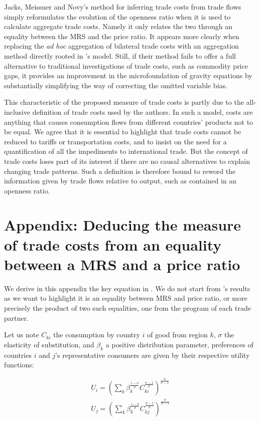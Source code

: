 \documentclass{article}
\begin{document}
Jacks, Meissner and Novy's method for inferring trade costs
from trade flows simply reformulates the evolution of the
openness ratio when it is used to calculate aggregate trade
costs. Namely it only relates the two through an
equality between the MRS and the price ratio. It appears more clearly
when replacing the \textit{ad hoc} aggregation of bilateral trade costs
with an aggregation method directly rooted in \cite{AW2003}'s model. Still, if their method fails to offer a
full alternative to traditional investigations of trade costs,
such as commodity price gaps, it provides an improvement in the
microfoundation of gravity equations by substantially
simplifying the way of correcting the omitted variable bias.

This characteristic of the proposed measure of trade costs is
partly due to the all-inclusive definition of trade
costs used by the authors. In such a model, costs are anything
that causes consumption flows from different countries' products not
to be equal. We agree that it is essential to highlight that
trade costs cannot be reduced to tariffs or transportation
costs, and to insist on the need for a quantification of all
the impediments to international trade. But the concept of
trade costs loses part of its interest if there are no causal
alternatives to explain changing trade patterns. Such a definition is
therefore bound to reword the information given by trade
flows relative to output, such as contained in an openness
ratio.

\appendix

\section{\label{A1}Appendix: Deducing the measure of trade costs from an equality between a MRS and a price ratio}

We derive in this appendix the key equation in \cite{JMN2011}.
We do not start from \cite{AW2003}'s results as we want to
highlight it is an equality between MRS and price ratio, or
more precisely the product of two such equalities, one from the
program of each trade partner.

Let us note $C_{ki}$ the consumption by country $i$ of good from
region $k$, $\sigma$ the elasticity of substitution, and
$\beta_k$ a positive distribution parameter, preferences of
countries $i$ and $j$'s representative consumers are given by
their respective utility functions:

\begin{eqnarray*}
U_i=\left(\sum_k\beta_{k}^{\frac{1-\sigma}{\sigma}}C_{ki}^{\frac{\sigma-1}{\sigma}}\right)^{\frac{\sigma}{\sigma-1}}\\
U_j=\left(\sum_k\beta_{k}^{\frac{1-\sigma}{\sigma}}C_{kj}^{\frac{\sigma-1}{\sigma}}\right)^{\frac{\sigma}{\sigma-1}}
\end{eqnarray*}
\end{document}

